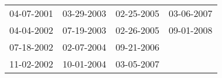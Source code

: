 \begin{supertabular}{llll}
 04-07-2001 &  03-29-2003 &  02-25-2005 &  03-06-2007 \\
 04-04-2002 &  07-19-2003 &  02-26-2005 &  09-01-2008 \\
 07-18-2002 &  02-07-2004 &  09-21-2006 &             \\
 11-02-2002 &  10-01-2004 &  03-05-2007 &             \\
\end{supertabular}
